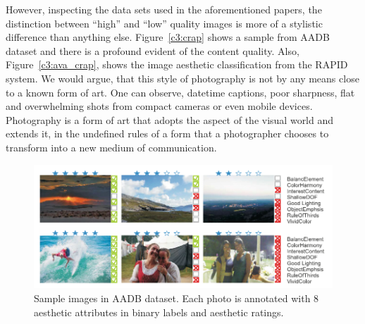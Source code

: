 However, inspecting the data sets used in the aforementioned papers, the distinction between ``high'' and ``low'' quality images is more of a stylistic difference than anything else. Figure~\ref{c3:crap} shows a sample from AADB dataset and there is a profound evident of the content quality. Also, Figure~\ref{c3:ava_crap}, shows the image aesthetic classification from the RAPID system.
We would argue, that this style of photography is not by any means close to a known form of art. One can observe, datetime captions, poor sharpness, flat and overwhelming shots from compact cameras or even mobile devices.
Photography is a form of art that adopts the aspect of the visual world and extends it, in the undefined rules of a form that a photographer chooses to transform into a new medium of communication.

\begin{figure}[ht!]
    \centering  
    \includegraphics[width=.6\textwidth]{figures/chap2/aesthetics/aadb_dataset}
    \caption{Sample images in AADB dataset. Each photo is annotated with 8 aesthetic attributes in binary labels and aesthetic ratings.}
    \label{c3:aadb}
\end{figure}

